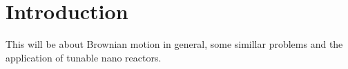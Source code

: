 \section{Introduction}

This will be about Brownian motion in general, some simillar problems and the application of tunable nano reactors.
